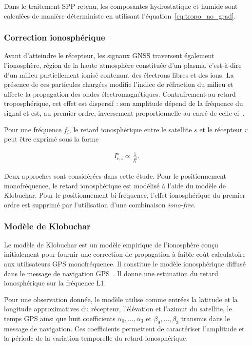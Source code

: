 Dans le traitement SPP retenu, les composantes hydrostatique et humide sont
calculées de manière déterministe en utilisant
l'équation~\ref{eq:tropo_no_grad}.

\subsubsection{Correction ionosphérique}

Avant d'atteindre le récepteur, les signaux GNSS traversent également
l'ionosphère, région de la haute atmosphère constituée d'un plasma, c'est-à-dire
d'un milieu partiellement ionisé contenant des électrons libres et des ions.
La présence de ces particules chargées modifie
l'indice de réfraction du milieu et affecte la propagation des ondes
électromagnétiques. Contrairement au retard troposphérique, cet effet est
dispersif : son amplitude dépend de la fréquence du signal et est, au
premier ordre, inversement proportionnelle au carré de celle-ci~\cite{hauschild2017observations}.

Pour une fréquence $f_i$, le retard ionosphérique entre le satellite $s$ et le
récepteur $r$ peut
être exprimé sous la forme

\begin{align}
I_{r,i}^s
\propto
\frac{1}{f_i^2}.
\end{align}

Deux approches sont considérées dans cette étude. Pour le positionnement
monofréquence, le retard ionosphérique est modélisé à l'aide du modèle de
Klobuchar. Pour le positionnement bi-fréquence, l'effet ionosphérique du
premier ordre est supprimé par l'utilisation d'une combinaison
\textit{iono-free}.

\subsubsection{Modèle de Klobuchar}

Le modèle de Klobuchar est un modèle empirique de l'ionosphère conçu
initialement pour fournir une correction de propagation à faible coût
calculatoire aux utilisateurs GPS monofréquence. Il constitue le modèle
ionosphérique diffusé dans le message de navigation GPS~\cite{klobuchar1987}. Il
donne une estimation du retard ionosphérique sur la fréquence
L1.

Pour une observation donnée, le modèle utilise comme entrées la latitude et
la longitude approximatives du récepteur, l'élévation et l'azimut du
satellite, le temps GPS ainsi que huit coefficients $\alpha_0,\ldots,
\alpha_3$ et $\beta_0,\ldots,\beta_3$ transmis dans le message de navigation.
Ces coefficients permettent de caractériser l'amplitude et la période de la
variation temporelle du retard ionosphérique.

